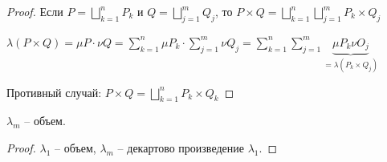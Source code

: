 \begin{proof}
    Если $P = \bigsqcup\limits_{k=1}^n P_k$ и $Q =  \bigsqcup\limits_{j=1}^m Q_j$, то $P\times Q = \bigsqcup\limits_{k=1}^n \bigsqcup\limits_{j=1}^m P_k \times Q_j$

    $\lambda(P \times Q) = \mu P \cdot \nu Q = \sum\limits_{k=1}^n \mu P_k \cdot \sum\limits_{j=1}^m \nu Q_j = \sum\limits_{k=1}^n \sum\limits_{j=1}^m \underbrace{\mu P_k \nu O_j}_{=\lambda (P_k \times Q_j)}$

    Противный случай: $P\times Q = \bigsqcup\limits_{k=1}^n P_k \times Q_k$
\end{proof}

\begin{corollary}
    $\lambda_m$ – объем.
\end{corollary}

\begin{proof}
    $\lambda_1$ – объем, $\lambda_m$ – декартово произведение $\lambda_1$.
\end{proof}